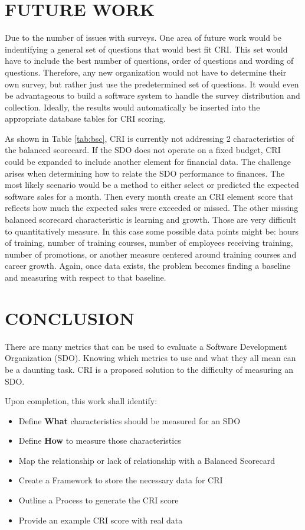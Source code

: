 \documentclass[SDSUThesis.tex]{subfiles}
\begin{document}
\section{FUTURE WORK}

Due to the number of issues with surveys.  One area of future work would be indentifying
a general set of questions that would best fit CRI.  This set would have to include
the best number of questions, order of questions and wording of questions.  Therefore,
any new organization would not have to determine their own survey, but rather just use the
predetermined set of questions.  It would even be advantageous to build a software system to
handle the survey distribution and collection.  Ideally, the results would automatically be
inserted into the appropriate database tables for CRI scoring. 

As shown in Table \ref{tab:bsc}, CRI is currently not addressing 2 characteristics of the balanced scorecard.  If the SDO does not operate on a fixed budget, CRI could be 
expanded to include another element for financial data. The challenge arises when
determining how to relate the SDO performance to finances.  The most likely scenario
would be a method to either select or predicted the expected software sales
for a month.  Then every month create an CRI element score that reflects
how much the expected sales were exceeded or missed.  The other missing
balanced scorecard characteristic is learning and growth.  Those are very difficult
to quantitatively measure.  In this case some possible data points might be:
hours of training, number of training courses, number of employees receiving
training, number of promotions, or another measure centered around training
courses and career growth.  Again, once data exists, the problem becomes finding
a baseline and measuring with respect to that baseline.



\section{CONCLUSION}

There are many metrics that can be used to evaluate a Software Development Organization (SDO). 
Knowing which metrics to use and what they all mean can be a daunting task.  CRI is a
proposed solution to the difficulty of measuring an SDO.

Upon completion, this work shall identify:
\begin{itemize}
    \item Define \textbf{What} characteristics should be measured for an SDO
    \item Define \textbf{How} to measure those characteristics
    \item Map the relationship or lack of relationship with a Balanced Scorecard
    \item Create a Framework to store the necessary data for CRI
    \item Outline a Process to generate the CRI score
    \item Provide an example CRI score with real data
\end{itemize}
\end{document}
